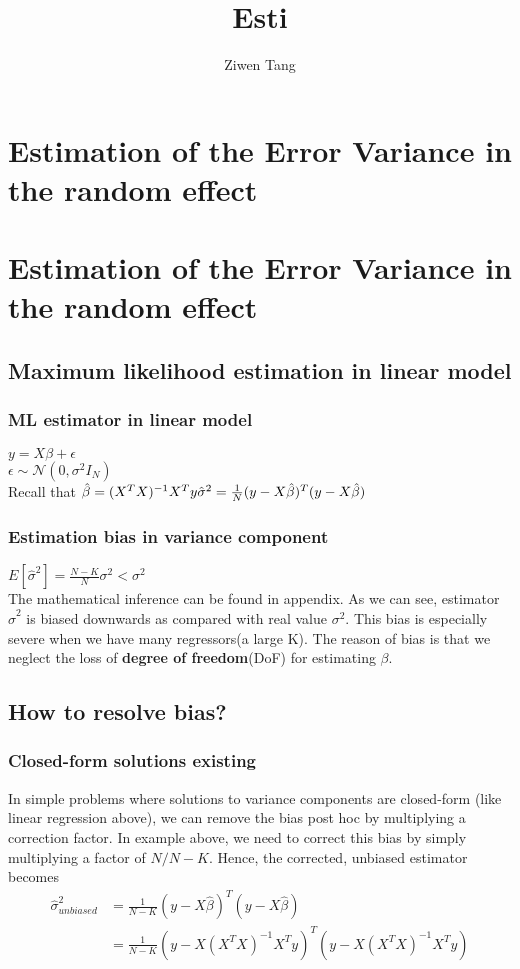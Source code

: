 \documentclass[a4paper,11pt]{article}
\begin{document}
  
\title{Esti}
\author{Ziwen Tang}
\maketitle

\section{Estimation of the Error Variance in the random effect}

\section{Estimation of the Error Variance in the random effect}
\subsection{Maximum likelihood estimation in linear model}
\subsubsection{ML estimator in linear model}
     $y = X\beta + \epsilon$
     \newcommand\iid{i.i.d.}
     \newcommand\pN{\mathcal{N}}
     \\$\epsilon \sim \pN(0,\sigma^2I_N)$
     \\Recall that $\hat{\beta} = ({X^TX})^{-1}X^Ty 
     \\{\hat{\sigma}}^2 = \frac1N(y-X\hat{\beta})^T(y-X\hat{\beta})$
    
\subsubsection{Estimation bias in variance component}
    $ E[{\hat{\sigma}}^ 2] = \frac{N-K}{N}\sigma^2<\sigma^2$
    \\The mathematical inference can be found in appendix. As we can see, estimator ${\hat{\sigma}}^ 2$ is biased downwards as compared with real value $\sigma^2$. This bias is especially severe when we have many regressors(a large K). The reason of bias is that we neglect the loss of \textbf{degree of freedom}(DoF) for estimating $\beta$.
\subsection{How to resolve bias?}
\subsubsection{Closed-form solutions existing}
    In simple problems where solutions to variance components are closed-form (like linear regression above), we can remove the bias post hoc by multiplying a correction factor. In example above, we need to correct this bias by simply multiplying a factor of $N/N-K$. Hence, the corrected, unbiased estimator becomes
    \begin{equation}
    \begin{aligned}
    {\hat{\sigma}}^2_{unbiased} &= \frac1{N-K}(y-X\hat{\beta})^T(y-X\hat{\beta})\\
    &=\frac1{N-K}(y-X({X^TX})^{-1}X^Ty)^T(y-X({X^TX})^{-1}X^Ty)
    \end{aligned}
    \end{equation}
\end{document}
